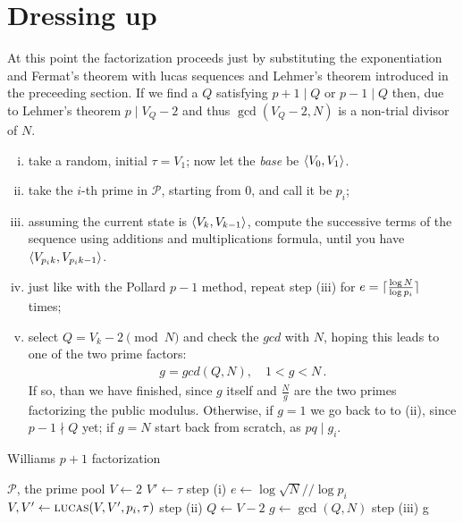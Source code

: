 \section{Dressing up}

At this point the factorization proceeds just by substituting the
exponentiation and Fermat's theorem with lucas sequences and Lehmer's theorem
introduced in the preceeding section. If we find a $Q$ satisfying $p+1 \mid Q
\text{ or } p-1 \mid Q$ then, due to Lehmer's theorem $p \mid V_Q -2$ and thus
$\gcd(V_Q -2, N)$ is a non-trial divisor of $N$.

\begin{enumerate}[(i)]
\item take a random, initial $\tau = V_1$; now let the \emph{base} be
  $\langle V_0, V_1\rangle$.
\item take the $i$-th prime in $\mathcal{P}$, starting from $0$, and call it be
  $p_i$;
\item assuming the current state is $\langle V_k, V_{k-1}\rangle$, compute the
  successive terms of the sequence using additions and multiplications formula,
  until you have $\langle V_{p_ik}, V_{p_ik - 1}\rangle$.
\item just like with the Pollard $p-1$ method, repeat step (iii) for $e =
  \lceil\frac{\log N}{\log p_i}\rceil$ times;
\item select $Q = V_k - 2 \pmod{N}$ and check the $gcd$ with $N$, hoping this
  leads to one of the two prime factors:
\begin{align}
  g = gcd(Q, N), \quad 1 < g < N \,.
\end{align}
If so, than we have finished, since $g$ itself and $\frac{N}{g}$
are the two primes factorizing the public  modulus.
Otherwise, if $g = 1$ we go back to to (ii), since $p-1 \nmid Q$ yet;
if $g = N$ start back from scratch, as $pq \mid g_i$.

\end{enumerate}



\begin{algorithm}
  \caption{Williams $p+1$ factorization}
  \begin{algorithmic}[1]
    \Require $\mathcal{P}$, the prime pool
      \State $V \gets 2$
      \State $V' \gets \tau$
      \Comment step (i)
        \State $e \gets \log \sqrt{N} // \log p_i$
          \State $V, V' \gets \textsc{lucas}(V, V', p_i, \tau)$
          \Comment step (ii)
          \State $Q \gets V -2$
          \State $g \gets \gcd(Q, N)$
          \Comment step (iii)
           \Return {}
           \Return g
          \EndIf
        \EndFor
      \EndFor
    \EndFunction
  \end{algorithmic}
\end{algorithm}
